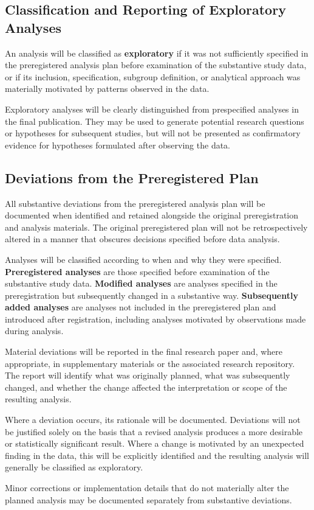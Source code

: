 \subsection{Classification and Reporting of Exploratory Analyses}

An analysis will be classified as \textbf{exploratory} if it was not sufficiently specified in the preregistered analysis plan before examination of the substantive study data, or if its inclusion, specification, subgroup definition, or analytical approach was materially motivated by patterns observed in the data.

Exploratory analyses will be clearly distinguished from prespecified analyses in the final publication. They may be used to generate potential research questions or hypotheses for subsequent studies, but will not be presented as confirmatory evidence for hypotheses formulated after observing the data.

\subsection{Deviations from the Preregistered Plan}

All substantive deviations from the preregistered analysis plan will be documented when identified and retained alongside the original preregistration and analysis materials. The original preregistered plan will not be retrospectively altered in a manner that obscures decisions specified before data analysis.

Analyses will be classified according to when and why they were specified. \textbf{Preregistered analyses} are those specified before examination of the substantive study data. \textbf{Modified analyses} are analyses specified in the preregistration but subsequently changed in a substantive way. \textbf{Subsequently added analyses} are analyses not included in the preregistered plan and introduced after registration, including analyses motivated by observations made during analysis.

Material deviations will be reported in the final research paper and, where appropriate, in supplementary materials or the associated research repository. The report will identify what was originally planned, what was subsequently changed, and whether the change affected the interpretation or scope of the resulting analysis.

Where a deviation occurs, its rationale will be documented. Deviations will not be justified solely on the basis that a revised analysis produces a more desirable or statistically significant result. Where a change is motivated by an unexpected finding in the data, this will be explicitly identified and the resulting analysis will generally be classified as exploratory.

Minor corrections or implementation details that do not materially alter the planned analysis may be documented separately from substantive deviations.

